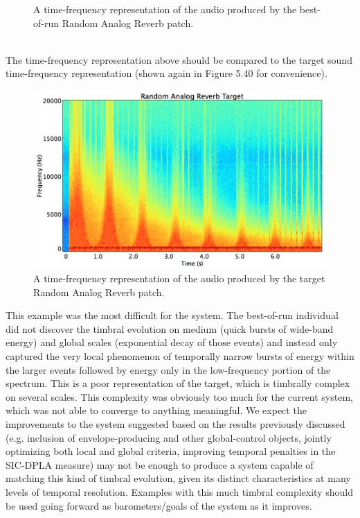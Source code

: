 \documentclass[a4paper,12pt]{report} 	%
\numberwithin{figure}{chapter}
\numberwithin{table}{chapter}
\numberwithin{equation}{chapter}
\begin{document}
\begin{flushleft}
\begin{figure}[h!]
\begin{center}
\caption[Best-of-Run Random Analog Reverb Time-Frequency Representation]{A time-frequency representation of the audio produced by the best-of-run Random Analog Reverb patch.}
\end{center}
\end{figure}
\\
The time-frequency representation above should be compared to the target sound time-frequency representation (shown again in Figure 5.40 for convenience).
\begin{figure}[h!]
\begin{center}
\includegraphics[scale=0.35,width=\linewidth]{RandomAnalogReverbTargetSTFT}
\caption[Target Random Analog Reverb Time-Frequency Representation]{A time-frequency representation of the audio produced by the target Random Analog Reverb patch.}
\end{center}
\end{figure}
This example was the most difficult for the system. The best-of-run individual did not discover the timbral evolution on medium (quick bursts of wide-band energy) and global scales (exponential decay of those events) and instead only captured the very local phenomenon of temporally narrow bursts of energy within the larger events followed by energy only in the low-frequency portion of the spectrum. This is a poor representation of the target, which is timbrally complex on several scales. This complexity was obviously too much for the current system, which was not able to converge to anything meaningful. We expect the improvements to the system suggested based on the results previously discussed (e.g. inclusion of envelope-producing and other global-control objects, jointly optimizing both local and global criteria, improving temporal penalties in the SIC-DPLA measure) may not be enough to produce a system capable of matching this kind of timbral evolution, given its distinct characteristics at many levels of temporal resolution. Examples with this much timbral complexity should be used going forward as barometers/goals of the system as it improves.


\end{flushleft}
\end{document}
